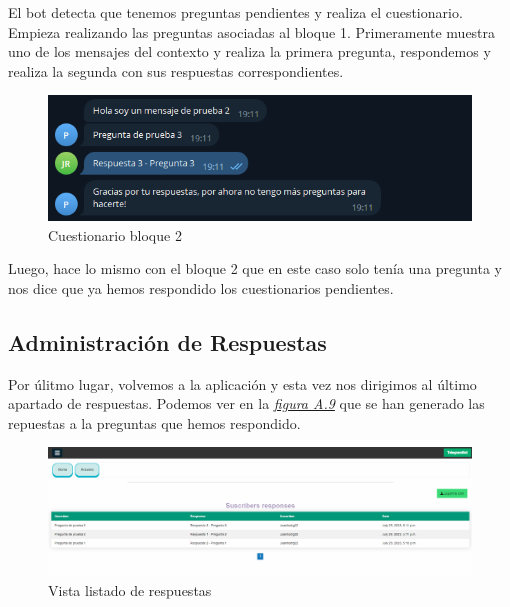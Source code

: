 El bot detecta que tenemos preguntas pendientes y realiza el cuestionario. Empieza realizando las preguntas asociadas al bloque 1. Primeramente muestra uno de los mensajes del contexto y realiza la primera pregunta, respondemos y realiza la segunda con sus respuestas correspondientes. 

\begin{figure}[!ht]
    \centering
    \includegraphics[width=1\textwidth]{imagenes/pregunta_prueba2_a.png}
    \caption{ Cuestionario bloque 2 }
    \label{fig:creacion_contexto}
\end{figure}\vspace{0.5cm}

Luego, hace lo mismo con el bloque 2 que en este caso solo tenía una pregunta y nos dice que ya hemos respondido los cuestionarios pendientes. 


\subsection{Administración de Respuestas}

Por úlitmo lugar, volvemos a la aplicación y esta vez nos dirigimos al último apartado de respuestas. Podemos ver en la \textit{\hyperref[fig:listado_respuestas]{figura A.9}} que se han generado las repuestas a la preguntas que hemos respondido. 

\begin{figure}[!ht]
    \centering
    \includegraphics[width=1\textwidth]{imagenes/list_respuestas_a.png}
    \caption{ Vista listado de respuestas }
    \label{fig:listado_respuestas}
\end{figure}\vspace{0.5cm}

